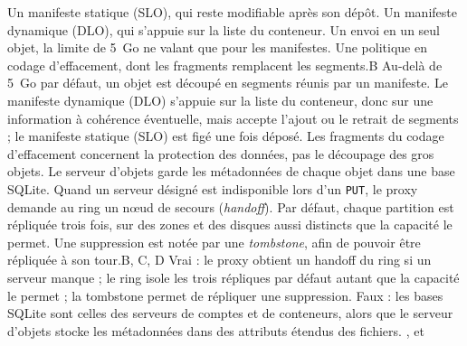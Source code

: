   {Un manifeste statique (SLO), qui reste modifiable après son dépôt.}
  {Un manifeste dynamique (DLO), qui s'appuie sur la liste du conteneur.}
  {Un envoi en un seul objet, la limite de 5~Go ne valant que pour les manifestes.}
  {Une politique en codage d'effacement, dont les fragments remplacent les segments.}{B}
  {Au-delà de 5~Go par défaut, un objet est découpé en segments réunis par un manifeste. Le manifeste dynamique (DLO) s'appuie sur la liste du conteneur, donc sur une information à cohérence éventuelle, mais accepte l'ajout ou le retrait de segments ; le manifeste statique (SLO) est figé une fois déposé. Les fragments du codage d'effacement concernent la protection des données, pas le découpage des gros objets.}
  {}
  {Le serveur d'objets garde les métadonnées de chaque objet dans une base SQLite.}
  {Quand un serveur désigné est indisponible lors d'un \texttt{PUT}, le proxy demande au ring un nœud de secours (\emph{handoff}).}
  {Par défaut, chaque partition est répliquée trois fois, sur des zones et des disques aussi distincts que la capacité le permet.}
  {Une suppression est notée par une \emph{tombstone}, afin de pouvoir être répliquée à son tour.}{B, C, D}
  {Vrai : le proxy obtient un handoff du ring si un serveur manque ; le ring isole les trois répliques par défaut autant que la capacité le permet ; la tombstone permet de répliquer une suppression. Faux : les bases SQLite sont celles des serveurs de comptes et de conteneurs, alors que le serveur d'objets stocke les métadonnées dans des attributs étendus des fichiers.}
  {,  et }

